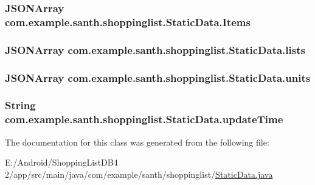 \subsubsection[{\texorpdfstring{Items}{Items}}]{\setlength{\rightskip}{0pt plus 5cm}J\+S\+O\+N\+Array com.\+example.\+santh.\+shoppinglist.\+Static\+Data.\+Items}\hypertarget{classcom_1_1example_1_1santh_1_1shoppinglist_1_1_static_data_a8396eedfbdf79abf82f0081dc135af42}{}\label{classcom_1_1example_1_1santh_1_1shoppinglist_1_1_static_data_a8396eedfbdf79abf82f0081dc135af42}
\subsubsection[{\texorpdfstring{lists}{lists}}]{\setlength{\rightskip}{0pt plus 5cm}J\+S\+O\+N\+Array com.\+example.\+santh.\+shoppinglist.\+Static\+Data.\+lists}\hypertarget{classcom_1_1example_1_1santh_1_1shoppinglist_1_1_static_data_a2e553853981a2db0df178ecaa73b3a6a}{}\label{classcom_1_1example_1_1santh_1_1shoppinglist_1_1_static_data_a2e553853981a2db0df178ecaa73b3a6a}
\subsubsection[{\texorpdfstring{units}{units}}]{\setlength{\rightskip}{0pt plus 5cm}J\+S\+O\+N\+Array com.\+example.\+santh.\+shoppinglist.\+Static\+Data.\+units}\hypertarget{classcom_1_1example_1_1santh_1_1shoppinglist_1_1_static_data_a44bfa240d7ced9aa65e395d1f37e32c0}{}\label{classcom_1_1example_1_1santh_1_1shoppinglist_1_1_static_data_a44bfa240d7ced9aa65e395d1f37e32c0}
\subsubsection[{\texorpdfstring{update\+Time}{updateTime}}]{\setlength{\rightskip}{0pt plus 5cm}String com.\+example.\+santh.\+shoppinglist.\+Static\+Data.\+update\+Time}\hypertarget{classcom_1_1example_1_1santh_1_1shoppinglist_1_1_static_data_ab79e46d3d064f42471fa34c85f69e81b}{}\label{classcom_1_1example_1_1santh_1_1shoppinglist_1_1_static_data_ab79e46d3d064f42471fa34c85f69e81b}


The documentation for this class was generated from the following file\+:\begin{DoxyCompactItemize}
\item 
E\+:/\+Android/\+Shopping\+List\+D\+B4 2/app/src/main/java/com/example/santh/shoppinglist/\hyperlink{_static_data_8java}{Static\+Data.\+java}\end{DoxyCompactItemize}
